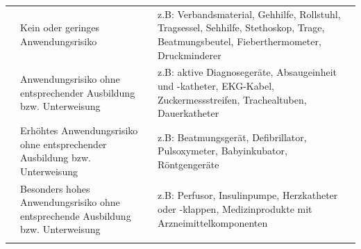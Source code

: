 \begin{table}[H]

\begin{tabulary}{\linewidth}{lLL}\addlinespace
{}
&
Kein oder geringes Anwendungsrisiko
&
z.B: Verbandsmaterial, Gehhilfe, Rollstuhl, Tragsessel, Sehhilfe, Stethoskop, 
Trage, Beatmungsbeutel, Fieberthermometer, Druckminderer 
\\\addlinespace
{}
&
Anwendungsrisiko ohne entsprechender Ausbildung bzw. Unterweisung
&
z.B: aktive Diagnosegeräte, Absaugeinheit und -katheter, EKG-Kabel, 
Zuckermessstreifen, Trachealtuben, Dauerkatheter 
\\\addlinespace
{}
&
Erhöhtes Anwendungsrisiko ohne entsprechender Ausbildung bzw. Unterweisung
&
z.B: Beatmungsgerät, Defibrillator, Pulsoxymeter, Babyinkubator, Röntgengeräte
\\\addlinespace
{}
&
Besonders hohes Anwendungsrisiko ohne entsprechende Ausbildung bzw. Unterweisung
&
z.B: Perfusor, Insulinpumpe, Herzkatheter oder -klappen, Medizinprodukte mit Arzneimittelkomponenten
\\\addlinespace\bottomrule
\end{tabulary}
\end{table}

